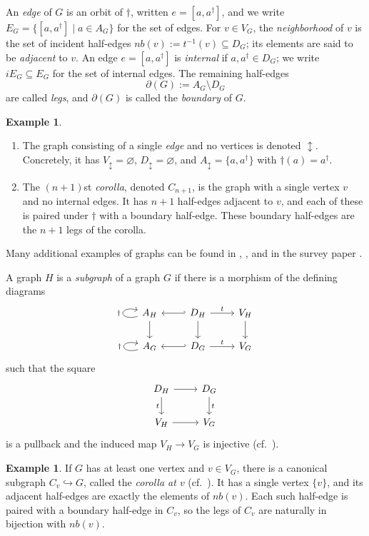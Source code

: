 \documentclass{amsart}
\newcommand{\nb}{nb}
\theoremstyle{definition}
\newtheorem{example}[theorem]{Example}%
\numberwithin{equation}{section}
\begin{document}
An \emph{edge} of $G$ is an orbit of $\dagger$, written $e=[a,a^\dagger]$, and we write $E_G=\{[a,a^\dagger]\mid a\in A_G\}$ for the set of edges. For $v\in V_G$, the \emph{neighborhood} of $v$ is the set of incident half-edges $\nb(v):=t^{-1}(v)\subseteq D_G$; its elements are said to be \emph{adjacent} to $v$. An edge $e=[a,a^\dagger]$ is \emph{internal} if $a,a^\dagger\in D_G$; we write $iE_G\subseteq E_G$ for the set of internal edges. The remaining half-edges
\[
\partial(G):=A_G\setminus D_G
\] are called \emph{legs}, and $\partial(G)$ is called the \emph{boundary} of $G$.

\begin{example}
\begin{enumerate}
    \item The graph consisting of a single \emph{edge} and no vertices is denoted $\updownarrow$. Concretely, it has $V_{\updownarrow}=\varnothing$, $D_{\updownarrow}=\varnothing$, and $A_{\updownarrow}=\{a,a^{\dagger}\}$ with $\dagger(a)=a^{\dagger}$.

    \item The $(n+1)$st \emph{corolla}, denoted $C_{n+1}$, is the graph with a single vertex $v$ and no internal edges. It has $n+1$ half-edges adjacent to $v$, and each of these is paired under $\dagger$ with a boundary half-edge. These boundary half-edges are the $n+1$ legs of the corolla.
\end{enumerate}
Many additional examples of graphs can be found in \cite{hry1}, \cite{hry_modular_nerve}, and in the survey paper \cite{hackney2022segal}.
\end{example}

A graph $H$ is a \emph{subgraph} of a graph $G$ if there is a morphism of the defining diagrams
\[
\begin{tikzcd}
\arrow[loop left]{l}{\dagger}A_{H}\arrow[d] & D_{H}\arrow[l,hook']\arrow[d] \arrow[r, "t"] & V_{H}\arrow[d]\\
\arrow[loop left]{l}{\dagger}A_{G}          & D_{G}\arrow[l,hook']          \arrow[r, "t"] & V_{G}
\end{tikzcd}
\]
such that the square
\[
\begin{tikzcd}
D_H \arrow[r]\arrow[d,"t"'] & D_G \arrow[d,"t"]\\
V_H \arrow[r] & V_G
\end{tikzcd}
\]
is a pullback and the induced map $V_H\to V_G$ is injective (cf.\ \cite[Definition~1.13]{hry1}).

\begin{example}\label{example: corolla at a vertex}
If $G$ has at least one vertex and $v\in V_G$, there is a canonical subgraph $C_v\hookrightarrow G$, called the \emph{corolla at $v$} (cf.\ \cite[Definition~1.5]{hry1}). It has a single vertex $\{v\}$, and its adjacent half-edges are exactly the elements of $\nb(v)$. Each such half-edge is paired with a boundary half-edge in $C_v$, so the legs of $C_v$ are naturally in bijection with $\nb(v)$.
\end{example}
\end{document}
